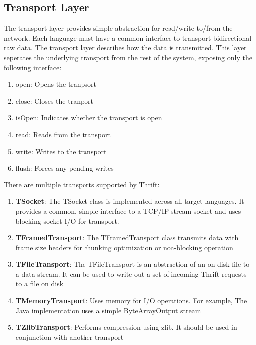 \documentclass[9pt,twocolumn,twoside]{../../styles/osajnl}
\begin{document}
\subsection{Transport Layer}
The transport layer provides simple abstraction for read/write to/from the network. Each language must have a common interface to transport bidirectional raw data. The transport layer describes how the data is transmitted. This layer seperates the underlying transport from the rest of the system, exposing only the following interface:
\begin{enumerate}
	\item open: Opens the tranpsort
	\item close: Closes the tranport
	\item isOpen: Indicates whether the transport is open
	\item read: Reads from the transport
	\item write: Writes to the transport
	\item flush: Forces any pending writes\\
\end{enumerate}


There are multiple transports supported by Thrift:
\begin{enumerate}
	\item \textbf{TSocket}: The TSocket class is implemented across all target languages. It provides a common, simple interface to a TCP/IP stream socket and uses blocking socket I/O for transport.
	\item \textbf{TFramedTransport}: The TFramedTransport class transmits data with frame size headers for chunking optimization or non-blocking operation
	\item \textbf{TFileTransport}: The TFileTransport is an abstraction of an on-disk file to a data stream. It can be used to write out a set of incoming Thrift requests to a file on disk
	\item \textbf{TMemoryTransport}: Uses memory for I/O operations. For example, The Java implementation uses a simple ByteArrayOutput stream
	\item \textbf{TZlibTransport}: Performs compression using zlib. It should be used in conjunction with another transport
\end{enumerate}
\end{document}
